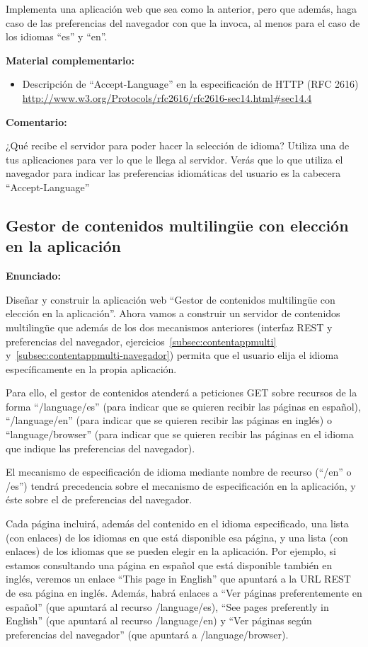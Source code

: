 Implementa una aplicación web que sea como la anterior, pero que además, haga caso de las preferencias del navegador con que la invoca, al menos para el caso de los idiomas ``es'' y ``en''.

\textbf{Material complementario:}
\begin{itemize}
\item Descripción de ``Accept-Language'' en la especificación de HTTP (RFC 2616) \\
  \url{http://www.w3.org/Protocols/rfc2616/rfc2616-sec14.html#sec14.4}
\end{itemize}

\textbf{Comentario:}

¿Qué recibe el servidor para poder hacer la selección de idioma? Utiliza una de tus aplicaciones para ver lo que le llega al servidor. Verás que lo que utiliza el navegador para indicar las preferencias idiomáticas del usuario es la cabecera ``Accept-Language''

\subsection{Gestor de contenidos multilingüe con elección en la aplicación}
\label{subsec:contentappmulti-apli}

\textbf{Enunciado:}

Diseñar y construir la aplicación web ``Gestor de contenidos multilingüe con elección en la aplicación''. Ahora vamos a construir un servidor de contenidos multilingüe que además de los dos mecanismos anteriores (interfaz REST y preferencias del navegador, ejercicios~\ref{subsec:contentappmulti} y~\ref{subsec:contentappmulti-navegador}) permita que el usuario elija el idioma específicamente en la propia aplicación.

Para ello, el gestor de contenidos atenderá a peticiones GET sobre recursos de la forma ``/language/es'' (para indicar que se quieren recibir las páginas en español), ``/language/en'' (para indicar que se quieren recibir las páginas en inglés) o ``language/browser'' (para indicar que se quieren recibir las páginas en el idioma que indique las preferencias del navegador).

El mecanismo de especificación de idioma mediante nombre de recurso (``/en'' o /es'') tendrá precedencia sobre el mecanismo de especificación en la aplicación, y éste sobre el de preferencias del navegador.

Cada página incluirá, además del contenido en el idioma especificado, una lista (con enlaces) de los idiomas en que está disponible esa página, y una lista (con enlaces) de los idiomas que se pueden elegir en la aplicación. Por ejemplo, si estamos consultando una página en español que está disponible también en inglés, veremos un enlace ``This page in English'' que apuntará a la URL REST de esa página en inglés. Además, habrá enlaces a ``Ver páginas preferentemente en español'' (que apuntará al recurso /language/es), ``See pages preferently in English'' (que apuntará al recurso /language/en) y ``Ver páginas según preferencias del navegador'' (que apuntará a /language/browser).

